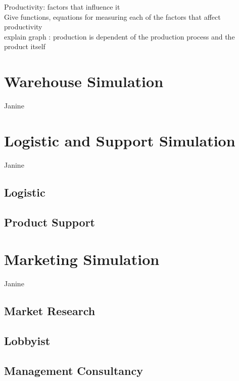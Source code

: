 \documentclass[11pt,titlepage,oneside,openany]{book}
\begin{document}
Productivity: factors that influence it \\
Give functions, equations for measuring each of the factors that affect productivity \\
explain graph : production is dependent of the production process and the product itself 

\section{Warehouse Simulation}
Janine\ \\
% 

\section{Logistic and Support Simulation}
Janine\ \\
\subsection{Logistic}
% 

\subsection{Product Support}
% 

\section{Marketing Simulation}
Janine\ \\
\subsection{Market Research}
% 

\subsection{Lobbyist}
% 

\subsection{Management Consultancy}
% 
\end{document}
